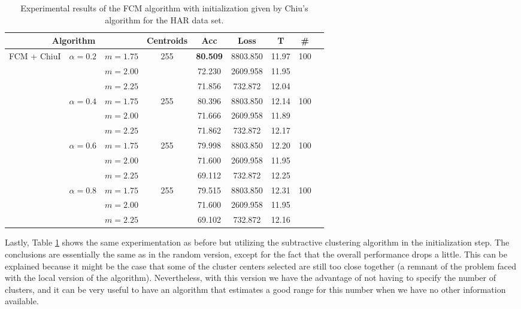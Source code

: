 \begin{table}[h!]
  \centering
\caption{Experimental results of the FCM algorithm with initialization given by Chiu's algorithm for the HAR data set.}
\label{tab:har3}
\begin{tabular}{ccccccccc}
\toprule
\multicolumn{3}{c}{Algorithm} & Centroids & Acc & Loss & T & \# \\ \midrule
\multirow{12}{*}{FCM + ChiuI} & \multirow{3}{*}{$\alpha = 0.2$} & $m=1.75$ & \multirow{3}{*}{255} & \textbf{80.509} & 8803.850 & 11.97 & \multirow{3}{*}{100}\\ \
 &  & $m=2.00$ &  & 72.230 & 2609.958 & 11.95 &\\
 &  & $m=2.25$ &  & 71.856 & 732.872 & 12.04 &\\ \cline{2-8}
 & \multirow{3}{*}{$\alpha = 0.4$} & $m=1.75$ & \multirow{3}{*}{255} & 80.396 & 8803.850 & 12.14 &\multirow{3}{*}{100}\\
 &  & $m=2.00$ &  & 71.666 & 2609.958 & 11.89 &\\
 &  & $m=2.25$ &  & 71.862 & 732.872 & 12.17 & \\ \cline{2-8}
 & \multirow{3}{*}{$\alpha = 0.6$} & $m=1.75$ & \multirow{3}{*}{255} & 79.998 & 8803.850 & 12.20 &\multirow{3}{*}{100}\\
 &  & $m=2.00$ &  & 71.600 & 2609.958 & 11.95 &\\
 &  & $m=2.25$ &  & 69.112 & 732.872 & 12.25 &\\ \cline{2-8}
 & \multirow{3}{*}{$\alpha = 0.8$} & $m=1.75$ & \multirow{3}{*}{255} & 79.515 & 8803.850 & 12.31 &\multirow{3}{*}{100}\\
 &  & $m=2.00$ &  & 71.600 & 2609.958 & 11.95 &\\
 &  & $m=2.25$ &  & 69.102 & 732.872 & 12.16 &\\ \bottomrule
\end{tabular}
\end{table}

Lastly, Table \ref{tab:har3} shows the same experimentation as before but utilizing the subtractive clustering algorithm in the initialization step. The conclusions are essentially the same as in the random version, except for the fact that the overall performance drops a little. This can be explained because it might be the case that some of the cluster centers selected are still too close together (a remnant of the problem faced with the local version of the algorithm). Nevertheless, with this version we have the advantage of not having to specify the number of clusters, and it can be very useful to have an algorithm that estimates a good range for this number when we have no other information available.

